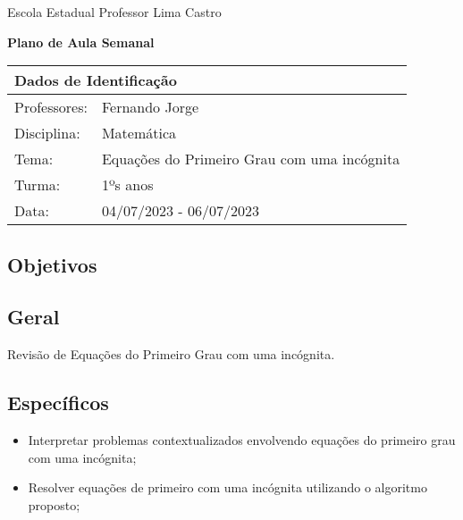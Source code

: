 \documentclass[oneside,a4paper,12pt]{article}
\newcommand{\universidade}{Escola Estadual Professor Lima Castro}
\newcommand{\professores}{Fernando Jorge}
\newcommand{\disciplina}{Matemática}
\newcommand{\tema}{Equações do Primeiro Grau com uma incógnita}
\newcommand{\turma}{1ºs anos}
\newcommand{\data}{04/07/2023 - 06/07/2023}
\begin{document}
\pagestyle{empty}

\begin{center}

	\universidade
	\par
	\vspace{10pt}
	\LARGE \textbf{Plano de Aula Semanal}

\end{center}

\vspace{10pt}

\begin{tabular}{ |l|p{12cm}| }

	\hline
	\multicolumn{2}{|l|}{\textbf{Dados de Identificação}} \\
	\hline
	Professores: & \professores                           \\
	\hline
	Disciplina:  & \disciplina                            \\
	\hline
	Tema:        & \tema                                  \\
	\hline
	Turma:       & \turma                                 \\
	\hline
	Data:        & \data                                  \\
	\hline
\end{tabular}

\begin{snugshade}
	\section{Objetivos} %
\end{snugshade}

\subsection{Geral} %

Revisão de Equações do Primeiro Grau com uma incógnita.

\subsection{Específicos} %

\begin{itemize}

	\item Interpretar problemas contextualizados envolvendo equações do primeiro grau com uma incógnita;
	\item Resolver equações de primeiro com uma incógnita utilizando o algoritmo proposto;

\end{itemize}
\end{document}
